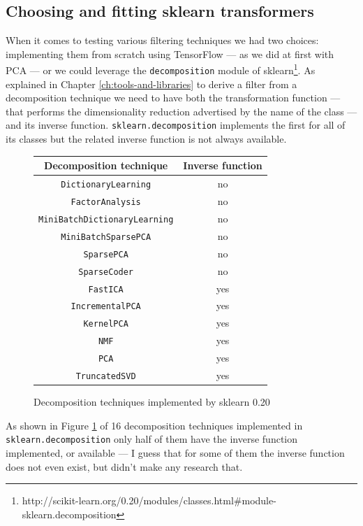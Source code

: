 \subsection{Choosing and fitting sklearn transformers}

When it comes to testing various filtering techniques we had two
choices: implementing them from scratch using TensorFlow --- as we did
at first with PCA --- or we could leverage the \texttt{decomposition}
module of
sklearn\footnote{http://scikit-learn.org/0.20/modules/classes.html\#module-sklearn.decomposition}.
As explained in Chapter \ref{ch:tools-and-libraries} to derive a filter
from a decomposition technique we need to have both the transformation
function --- that performs the dimensionality reduction advertised by
the name of the class --- and its inverse function.
\texttt{sklearn.decomposition} implements the first for all of its
classes but the related inverse function is not always available.

\begin{figure}
  \centering
  \begin{tabular}{|c|c|}
    \hline
    Decomposition technique & Inverse function\\
    \hline
    \texttt{DictionaryLearning} & no \\
    \hline
    \texttt{FactorAnalysis} & no \\
    \hline
    \texttt{MiniBatchDictionaryLearning} & no \\
    \hline
    \texttt{MiniBatchSparsePCA} & no \\
    \hline
    \texttt{SparsePCA} & no \\
    \hline
    \texttt{SparseCoder} & no \\
    \hline
    \texttt{FastICA} & yes \\
    \hline
    \texttt{IncrementalPCA} & yes \\
    \hline
    \texttt{KernelPCA} & yes \\
    \hline
    \texttt{NMF} & yes \\
    \hline
    \texttt{PCA} & yes \\
    \hline
    \texttt{TruncatedSVD} & yes \\
    \hline
  \end{tabular}
  \caption{Decomposition techniques implemented by sklearn 0.20}
  \label{fig:decomposition-techniques}
\end{figure}

As shown in Figure \ref{fig:decomposition-techniques} of 16
decomposition techniques implemented in \texttt{sklearn.decomposition}
only half of them have the inverse function implemented, or available
--- I guess that for some of them the inverse function does not even
exist, but didn't make any research that.

